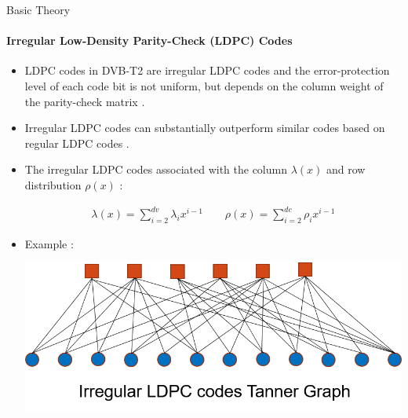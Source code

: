 \documentclass{beamer}
\begin{document}
\begin{frame}[shrink=28]{Basic Theory}
\framesubtitle{Irregular Low-Density Parity-Check (LDPC) Codes}
\begin{itemize}
\justifying
	\item LDPC codes in DVB-T2 are irregular LDPC codes and the error-protection level of each code bit is not uniform, but depends on the column weight of the parity-check matrix \footnotemark[1].
	\item Irregular LDPC codes can substantially outperform similar codes based on regular LDPC codes \footnotemark[2].
	\item The irregular LDPC codes associated with the column $\lambda(x)$ and row distribution $\rho(x)$ :


\begin{block}{}
\begin{gather}
\lambda  (x)=\sum_{i= 2}^{dv}\lambda_{i}x^{i-1} \qquad  \rho (x)=\sum_{i= 2}^{dc}\rho_{i}x^{i-1}
\end{gather}
\end{block}
\item Example :
\begin{multicols}{2}

  \null \vfill
  \includegraphics[scale=.5]{pict/irre.png}
  \vfill \null


\end{multicols}
\end{itemize}
\end{frame}
\end{document}
